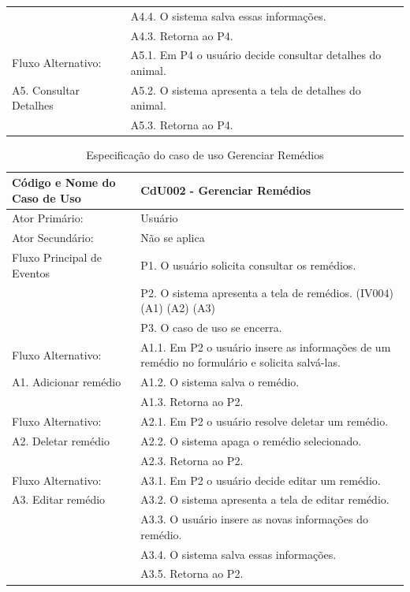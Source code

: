 \documentclass[12pt]{article}
\begin{document}
\begin{table}[!h]
\begin{center}
\begin{tabular}{ | l |  p{10cm} |}
						   & A4.4. O sistema salva essas informações. \\
						   & A4.3. Retorna ao P4. \\ \hline
			Fluxo Alternativo:         & A5.1. Em P4 o usuário decide consultar detalhes do animal. \\
			A5. Consultar Detalhes     & A5.2. O sistema apresenta a tela de detalhes do animal. \\
						   & A5.3. Retorna ao P4. \\
			\hline
		\end{tabular}
	\end{center}
\end{table}

\newpage

\begin{table}[!h]
	\begin{center}
		\caption{Especificação do caso de uso Gerenciar Remédios}
		\begin{tabular}{ | l |  p{10cm} |}
			\hline
			Código e Nome do Caso de Uso & CdU002 - Gerenciar Remédios \\ \hline
			Ator Primário: & Usuário \\ 
			Ator Secundário: & Não se aplica \\ \hline
			Fluxo Principal de Eventos & P1. O usuário solicita consultar os remédios. \\
						   & P2. O sistema apresenta a tela de remédios. (IV004) (A1) (A2) (A3) \\
						   & P3. O caso de uso se encerra. \\ \hline
			Fluxo Alternativo:         & A1.1. Em P2 o usuário insere as informações de um remédio no formulário e solicita salvá-las. \\
			A1. Adicionar remédio      & A1.2. O sistema salva o remédio. \\ 
						   & A1.3. Retorna ao P2. \\ \hline
			Fluxo Alternativo:         & A2.1. Em P2 o usuário resolve deletar um remédio. \\
			A2. Deletar remédio        & A2.2. O sistema apaga o remédio selecionado. \\
						   & A2.3. Retorna ao P2. \\ \hline
			Fluxo Alternativo:         & A3.1. Em P2 o usuário decide editar um remédio. \\
			A3. Editar remédio         & A3.2. O sistema apresenta a tela de editar remédio. \\
						   & A3.3. O usuário insere as novas informações do remédio. \\
						   & A3.4. O sistema salva essas informações. \\
						   & A3.5. Retorna ao P2. \\
			\hline
		\end{tabular}
	\end{center}
\end{table}
\end{document}
